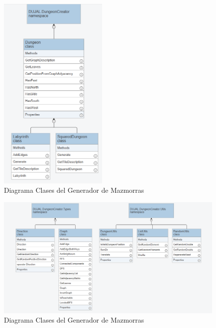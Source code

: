 \begin{figure}[H]
  \centering
    \includegraphics[width=200px,clip=true]{Dungeon_Generator.png}
  \caption{Diagrama Clases del Generador de Mazmorras}
  \label{fig:dungen1}
\end{figure}

\begin{figure}[H]
  \centering
    \includegraphics[width=450px,clip=true]{Dungeon_Generator_Utils.png}
  \caption{Diagrama Clases del Generador de Mazmorras}
  \label{fig:dungen2}
\end{figure}


